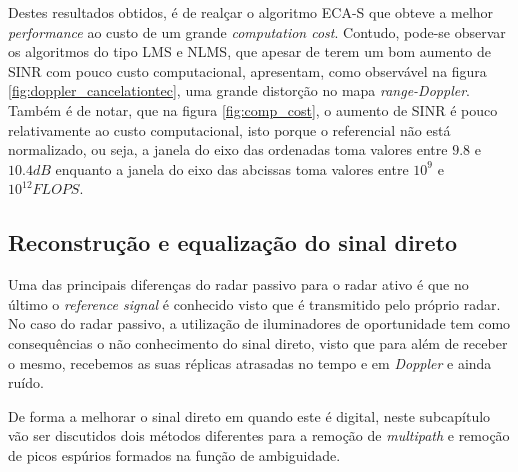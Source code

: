 Destes resultados obtidos, é de realçar o algoritmo \gls{ECA-S} que obteve a melhor \textit{performance} ao custo de um grande \textit{computation cost}. Contudo, pode-se observar os algoritmos do tipo \gls{LMS} e \gls{NLMS}, que apesar de terem um bom aumento de \gls{SINR} com pouco custo computacional, apresentam, como observável na figura \ref{fig:doppler_cancelationtec}, uma grande distorção no mapa \textit{range-Doppler}. Também é de notar, que na figura \ref{fig:comp_cost}, o aumento de \gls{SINR} é pouco relativamente ao custo computacional, isto porque o referencial não está normalizado, ou seja, a janela do eixo das ordenadas toma valores entre $9.8$ e $10.4 dB$ enquanto a janela do eixo das abcissas toma valores entre $10^{9}$ e $10^{12} FLOPS$.


\subsection{Reconstrução e equalização do sinal direto}
Uma das principais diferenças do radar passivo para o radar ativo é que no último o \textit{reference signal} é conhecido visto que é transmitido pelo próprio radar. No caso do radar passivo, a utilização de iluminadores de oportunidade tem como consequências o não conhecimento do sinal direto, visto que para além de receber o mesmo, recebemos as suas réplicas atrasadas no tempo e em \textit{Doppler} e ainda ruído.\par 
De forma a melhorar o sinal direto em quando este é digital, neste subcapítulo vão ser discutidos dois métodos diferentes para a remoção de \textit{multipath} e remoção de picos espúrios formados na função de ambiguidade.

